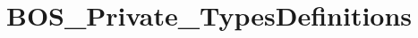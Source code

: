\hypertarget{group___b_o_s___private___types_definitions}{}\section{B\+O\+S\+\_\+\+Private\+\_\+\+Types\+Definitions}
\label{group___b_o_s___private___types_definitions}
